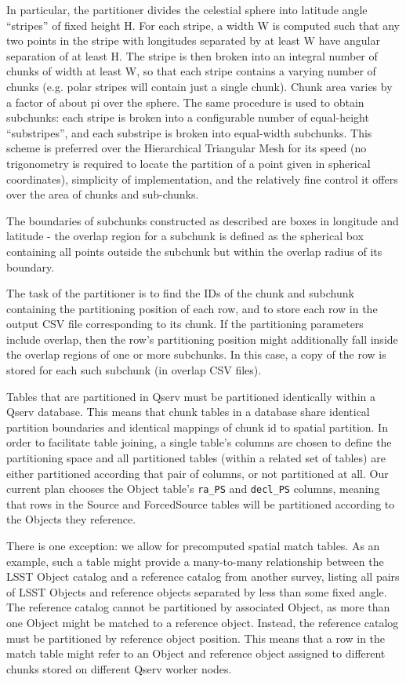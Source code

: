 \documentclass[DM,lsstdraft,toc]{lsstdoc}
\begin{document}
In particular, the partitioner divides the celestial sphere into
latitude angle ``stripes'' of fixed height H. For each stripe, a width W
is computed such that any two points in the stripe with longitudes
separated by at least W have angular separation of at least H. The
stripe is then broken into an integral number of chunks of width at
least W, so that each stripe contains a varying number of chunks (e.g.
polar stripes will contain just a single chunk). Chunk area varies by a
factor of about pi over the sphere. The same procedure is used to obtain
subchunks: each stripe is broken into a configurable number of
equal-height ``substripes'', and each substripe is broken into
equal-width subchunks. This scheme is preferred over the Hierarchical
Triangular Mesh for its speed (no trigonometry is required to locate the
partition of a point given in spherical coordinates), simplicity of
implementation, and the relatively fine control it offers over the area
of chunks and sub-chunks.

The boundaries of subchunks constructed as described are boxes in
longitude and latitude - the overlap region for a subchunk is defined as
the spherical box containing all points outside the subchunk but within
the overlap radius of its boundary.

The task of the partitioner is to find the IDs of the chunk and subchunk
containing the partitioning position of each row, and to store each row
in the output CSV file corresponding to its chunk. If the partitioning
parameters include overlap, then the row's partitioning position might
additionally fall inside the overlap regions of one or more subchunks.
In this case, a copy of the row is stored for each such subchunk (in
overlap CSV files).

Tables that are partitioned in Qserv must be partitioned identically
within a Qserv database. This means that chunk tables in a database
share identical partition boundaries and identical mappings of chunk id
to spatial partition. In order to facilitate table joining, a single
table's columns are chosen to define the partitioning space and all
partitioned tables (within a related set of tables) are either
partitioned according that pair of columns, or not partitioned at all.
Our current plan chooses the Object table's \texttt{ra\_PS} and
\texttt{decl\_PS} columns, meaning that rows in the Source and
ForcedSource tables will be partitioned according to the Objects they
reference.

There is one exception: we allow for precomputed spatial match tables.
As an example, such a table might provide a many-to-many relationship
between the LSST Object catalog and a reference catalog from another
survey, listing all pairs of LSST Objects and reference objects
separated by less than some fixed angle. The reference catalog cannot be
partitioned by associated Object, as more than one Object might be
matched to a reference object. Instead, the reference catalog must be
partitioned by reference object position. This means that a row in the
match table might refer to an Object and reference object assigned to
different chunks stored on different Qserv worker nodes.
\end{document}
